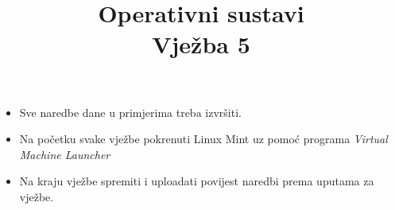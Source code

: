 \documentclass[a4paper,12pt]{article}
\title
{Operativni sustavi\\
Vježba 5}
\date{}
\begin{document}
\maketitle
{}



\begin{itemize}
\item Sve naredbe dane u primjerima treba izvršiti.
\item Na početku svake vježbe pokrenuti Linux Mint uz pomoć programa \textit{Virtual Machine Launcher}
\item Na kraju vježbe spremiti i uploadati povijest naredbi prema uputama za vježbe.

\end{itemize}

\end{document}
